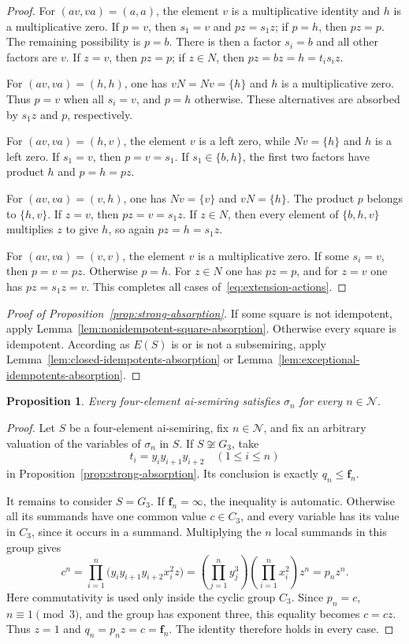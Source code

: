 \documentclass[11pt,reqno]{amsart}
\newtheorem{proposition}[theorem]{Proposition}
\theoremstyle{remark}
\newcommand{\Ncal}{\mathcal N}
\newcommand{\bfam}{\mathbf f}
\numberwithin{equation}{section}
\begin{document}
\begin{proof}
For $(av,va)=(a,a)$, the element $v$ is a multiplicative identity
and $h$ is a multiplicative zero. If $p=v$, then $s_1=v$ and
$pz=s_1z$; if $p=h$, then $pz=p$. The remaining possibility is $p=b$.
There is then a factor $s_i=b$ and all other factors are $v$.
If $z=v$, then $pz=p$; if $z\in N$, then
$pz=bz=h=t_i s_i z$.

For $(av,va)=(h,h)$, one has $vN=Nv=\{h\}$ and $h$ is a
multiplicative zero. Thus $p=v$ when all $s_i=v$, and $p=h$
otherwise. These alternatives are absorbed by $s_1z$ and $p$,
respectively.

For $(av,va)=(h,v)$, the element $v$ is a left zero, while
$Nv=\{h\}$ and $h$ is a left zero. If $s_1=v$, then $p=v=s_1$.
If $s_1\in\{b,h\}$, the first two factors have product $h$ and
$p=h=pz$.

For $(av,va)=(v,h)$, one has $Nv=\{v\}$ and $vN=\{h\}$.
The product $p$ belongs to $\{h,v\}$. If $z=v$, then
$pz=v=s_1z$. If $z\in N$, then every element of $\{b,h,v\}$
multiplies $z$ to give $h$, so again $pz=h=s_1z$.

For $(av,va)=(v,v)$, the element $v$ is a multiplicative zero.
If some $s_i=v$, then $p=v=pz$. Otherwise $p=h$.
For $z\in N$ one has $pz=p$, and for $z=v$ one has $pz=s_1z=v$.
This completes all cases of~\eqref{eq:extension-actions}.
\end{proof}

\begin{proof}[Proof of Proposition~\ref{prop:strong-absorption}]
If some square is not idempotent, apply
Lemma~\ref{lem:nonidempotent-square-absorption}. Otherwise every square
is idempotent. According as $E(S)$ is or is not a subsemiring,
apply Lemma~\ref{lem:closed-idempotents-absorption} or
Lemma~\ref{lem:exceptional-idempotents-absorption}.
\end{proof}

\begin{proposition}\label{prop:valid}
Every four-element ai-semiring satisfies $\sigma_n$ for every
$n\in\Ncal$.
\end{proposition}
\begin{proof}
Let $S$ be a four-element ai-semiring, fix $n\in\Ncal$, and fix an
arbitrary valuation of the variables of $\sigma_n$ in $S$.
If $S\not\cong G_3$, take
\[
t_i=y_i y_{i+1}y_{i+2}\quad(1\leq i\leq n)
\]
in Proposition~\ref{prop:strong-absorption}. Its conclusion is exactly
$q_n\leq\bfam_n$.

It remains to consider $S=G_3$. If $\bfam_n=\infty$, the inequality
is automatic. Otherwise all its summands have one common value
$c\in C_3$, and every variable has its value in $C_3$, since it occurs
in a summand. Multiplying the $n$ local summands in this group gives
\[
c^n=\prod_{i=1}^{n}\bigl(y_i y_{i+1}y_{i+2}x_i^2z\bigr)
   =\left(\prod_{j=1}^{n}y_j^3\right)
      \left(\prod_{i=1}^{n}x_i^2\right)z^n
   =p_n z^n.
\]
Here commutativity is used only inside the cyclic group $C_3$.
Since $p_n=c$, $n\equiv1\pmod3$, and the group has exponent three,
this equality becomes $c=cz$. Thus $z=1$ and
$q_n=p_nz=c=\bfam_n$. The identity therefore holds in every case.
\end{proof}
\end{document}
